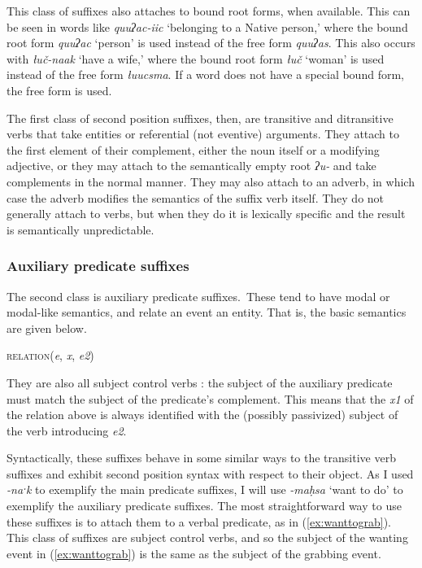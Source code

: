 This class of suffixes also attaches to bound root forms, when available. This can be seen in words like \textit{quuʔac-iic} `belonging to a Native person,' where the bound root form \textit{quuʔac} `person' is used instead of the free form \textit{quuʔas}. This also occurs with \textit{łuč-naak} `have a wife,' where the bound root form \textit{łuč} `woman' is used instead of the free form \textit{łuucsma}. If a word does not have a special bound form, the free form is used.

The first class of second position suffixes, then, are transitive and ditransitive verbs that take entities or referential (not eventive) arguments. They attach to the first element of their complement, either the noun itself or a modifying adjective, or they may attach to the semantically empty root \textit{ʔu-} and take complements in the normal manner. They may also attach to an adverb, in which case the adverb modifies the semantics of the suffix verb itself. They do not generally attach to verbs, but when they do it is lexically specific and the result is semantically unpredictable.

\subsubsection{Auxiliary predicate suffixes} \label{ch:clause:2pv:auxiliary}

The second class is auxiliary predicate suffixes. These tend to have modal or modal-like semantics, and relate an event an entity. That is, the basic semantics are given below.

\ex
\textsc{relation}(\textit{e}, \textit{x}, \textit{e2})
\xe

\noindent They are also all subject control verbs \citep[p.\ 160]{wojdak2005}: the subject of the auxiliary predicate must match the subject of the predicate's complement. This means that the \textit{x1} of the relation above is always identified with the (possibly passivized) subject of the verb introducing \textit{e2}.

Syntactically, these suffixes behave in some similar ways to the transitive verb suffixes and exhibit second position syntax with respect to their object. As I used \textit{-naˑk} to exemplify the main predicate suffixes, I will use \textit{-maḥsa} `want to do' to exemplify the auxiliary predicate suffixes. The most straightforward way to use these suffixes is to attach them to a verbal predicate, as in (\ref{ex:wanttograb}). This class of suffixes are subject control verbs, and so the subject of the wanting event in (\ref{ex:wanttograb}) is the same as the subject of the grabbing event.

